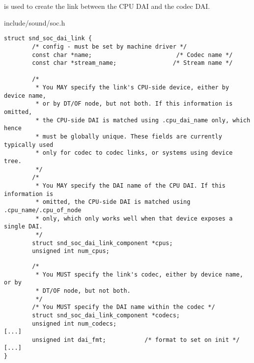 \begin{frame}[fragile]{}
 is used to create the link between the
  CPU DAI and the codec DAI.
  \begin{block}{include/sound/soc.h}
    \fontsize{8}{8}\selectfont
    \begin{verbatim}
struct snd_soc_dai_link {
        /* config - must be set by machine driver */
        const char *name;                        /* Codec name */
        const char *stream_name;                /* Stream name */

        /*
         * You MAY specify the link's CPU-side device, either by device name,
         * or by DT/OF node, but not both. If this information is omitted,
         * the CPU-side DAI is matched using .cpu_dai_name only, which hence
         * must be globally unique. These fields are currently typically used
         * only for codec to codec links, or systems using device tree.
         */
        /*
         * You MAY specify the DAI name of the CPU DAI. If this information is
         * omitted, the CPU-side DAI is matched using .cpu_name/.cpu_of_node
         * only, which only works well when that device exposes a single DAI.
         */
        struct snd_soc_dai_link_component *cpus;
        unsigned int num_cpus;
     \end{verbatim}
   \end{block}
\end{frame}

\begin{frame}[fragile]{}
  \begin{block}{}
    \fontsize{10}{10}\selectfont
    \begin{verbatim}
        /*
         * You MUST specify the link's codec, either by device name, or by
         * DT/OF node, but not both.
         */
        /* You MUST specify the DAI name within the codec */
        struct snd_soc_dai_link_component *codecs;
        unsigned int num_codecs;
[...]
        unsigned int dai_fmt;           /* format to set on init */
[...]
}
    \end{verbatim}
  \end{block}
\end{frame}

